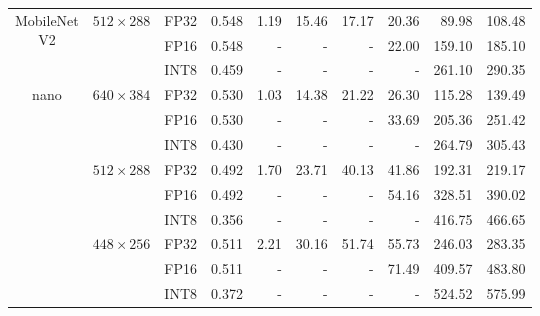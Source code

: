 \begin{appendices}
\begin{table}
\begin{tabular}{|c|c|c|c|rrrrrr|}
        \hline
        \multirow{3}{*}{\parbox{1.6cm}{\centering MobileNet\\V2}} & \multirow{3}{*}{$512 \times 288$} & FP32 & 0.548 &  1.19 &  15.46 &  17.17 &  20.36 &   89.98 &  108.48 \\
                                                                  &                                   & FP16 & 0.548 &     - &      - &      - &  22.00 &  159.10 &  185.10 \\
                                                                  &                                   & INT8 & 0.459 &     - &      - &      - &      - &  261.10 &  290.35 \\
        \hline
        \multirow{9}{*}{nano}                                     & \multirow{3}{*}{$640 \times 384$} & FP32 & 0.530 &  1.03 &  14.38 &  21.22 &  26.30 &  115.28 &  139.49 \\
                                                                  &                                   & FP16 & 0.530 &     - &      - &      - &  33.69 &  205.36 &  251.42 \\
                                                                  &                                   & INT8 & 0.430 &     - &      - &      - &      - &  264.79 &  305.43 \\
        \cline{2-10}
                                                                  & \multirow{3}{*}{$512 \times 288$} & FP32 & 0.492 &  1.70 &  23.71 &  40.13 &  41.86 &  192.31 &  219.17 \\
                                                                  &                                   & FP16 & 0.492 &     - &      - &      - &  54.16 &  328.51 &  390.02 \\
                                                                  &                                   & INT8 & 0.356 &     - &      - &      - &      - &  416.75 &  466.65 \\
        \cline{2-10}
                                                                  & \multirow{3}{*}{$448 \times 256$} & FP32 & 0.511 &  2.21 &  30.16 &  51.74 &  55.73 &  246.03 &  283.35 \\
                                                                  &                                   & FP16 & 0.511 &     - &      - &      - &  71.49 &  409.57 &  483.80 \\
                                                                  &                                   & INT8 & 0.372 &     - &      - &      - &      - &  524.52 &  575.99 \\

\end{tabular}
\end{table}
\end{appendices}

